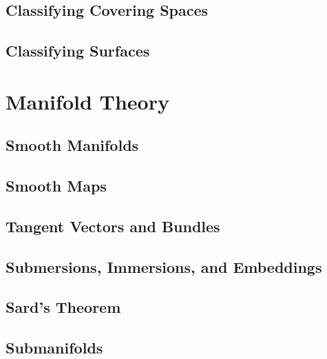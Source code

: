 \documentclass[12pt, a4paper, oneside, openright, titlepage]{book}
\begin{document}
\chapter{ Classifying Covering Spaces}


\chapter{ Classifying Surfaces}


\part{Manifold Theory}


\chapter{ Smooth Manifolds}


\chapter{ Smooth Maps}


\chapter{ Tangent Vectors and Bundles}


\chapter{ Submersions, Immersions, and Embeddings}



\chapter{ Sard's Theorem}




\chapter{ Submanifolds}



\end{document}
